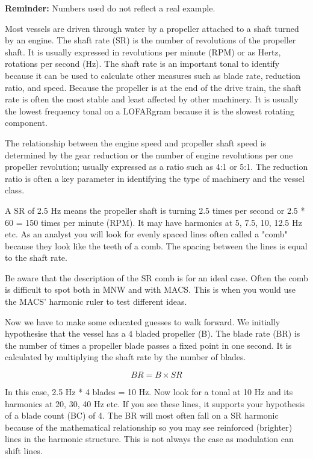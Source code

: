 \textbf{Reminder:} Numbers used do not reflect a real example.

Most vessels are driven through water by a propeller attached to a shaft turned by an engine. The shaft rate (SR) is the number of revolutions of the propeller shaft. It is usually expressed in revolutions per minute (RPM) or as Hertz, rotations per second (Hz). The shaft rate is an important tonal to identify because it can be used to calculate other measures such as blade rate, reduction ratio, and speed. Because the propeller is at the end of the drive train, the shaft rate is often the most stable and least affected by other machinery. It is usually the lowest frequency tonal on a LOFARgram because it is the slowest rotating component.

The relationship between the engine speed and propeller shaft speed is determined by the gear reduction or the number of engine revolutions per one propeller revolution; usually expressed as a ratio such as 4:1 or 5:1. The reduction ratio is often a key parameter in identifying the type of machinery and the vessel class.

A SR of 2.5 Hz means the propeller shaft is turning 2.5 times per second or 2.5 * 60 = 150 times per minute (RPM). It may have harmonics at 5, 7.5, 10, 12.5 Hz etc. As an analyst you will look for evenly spaced lines often called a "comb" because they look like the teeth of a comb. The spacing between the lines is equal to the shaft rate.

\begin{faintquote}
    Be aware that the description of the SR comb is for an ideal case. Often the comb is difficult to spot both in MNW and with MACS. This is when you would use the MACS' harmonic ruler to test different ideas.
\end{faintquote}

Now we have to make some educated guesses to walk forward. We initially hypothesise that the vessel has a 4 bladed propeller (B). The blade rate (BR) is the number of times a propeller blade passes a fixed point in one second. It is calculated by multiplying the shaft rate by the number of blades.

\[
    BR = B \times SR
\]

In this case, 2.5 Hz * 4 blades = 10 Hz. Now look for a tonal at 10 Hz and its harmonics at 20, 30, 40 Hz etc. If you see these lines, it supports your hypothesis of a blade count (BC) of 4. The BR will most often fall on a SR harmonic because of the mathematical relationship so you may see reinforced (brighter) lines in the harmonic structure. This is not always the case as modulation can shift lines.

